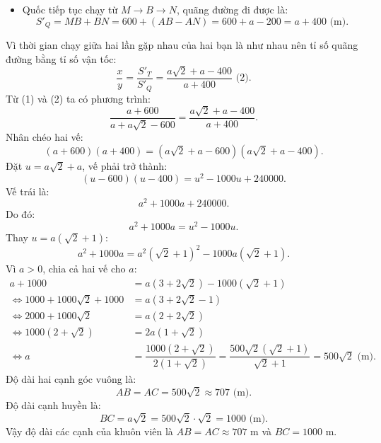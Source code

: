 \begin{bt}
{\begin{enumerate}[a)]
\begin{itemize}
		$$S'_T = MC + CA + AN = (a\sqrt{2} - 600) + a + 200 = a\sqrt{2} + a - 400\text{ (m)}.$$
		\item Quốc tiếp tục chạy từ $M \to B \to N$, quãng đường đi được là:
		$$S'_Q = MB + BN = 600 + (AB - AN) = 600 + a - 200 = a + 400\text{ (m)}.$$
	\end{itemize}
	Vì thời gian chạy giữa hai lần gặp nhau của hai bạn là như nhau nên tỉ số quãng đường bằng tỉ số vận tốc:
	$$\dfrac{x}{y} = \dfrac{S'_T}{S'_Q} = \dfrac{a\sqrt{2} + a - 400}{a + 400}\text{ (2)}.$$
	Từ (1) và (2) ta có phương trình:
	$$\dfrac{a + 600}{a + a\sqrt{2} - 600} = \dfrac{a\sqrt{2} + a - 400}{a + 400}.$$
	Nhân chéo hai vế:
	$$(a + 600)(a + 400) = (a\sqrt{2} + a - 600)(a\sqrt{2} + a - 400).$$
	Đặt $u = a\sqrt{2} + a$, vế phải trở thành:
	$$(u - 600)(u - 400) = u^2 - 1000u + 240000.$$
	Vế trái là:
	$$a^2 + 1000a + 240000.$$
	Do đó:
	$$a^2 + 1000a = u^2 - 1000u.$$
	Thay $u = a(\sqrt{2} + 1)$:
	$$a^2 + 1000a = a^2(\sqrt{2} + 1)^2 - 1000a(\sqrt{2} + 1).$$
	Vì $a > 0$, chia cả hai vế cho $a$:
	\begin{align*}
		a + 1000 &= a(3 + 2\sqrt{2}) - 1000(\sqrt{2} + 1) \\
		\iff 1000 + 1000\sqrt{2} + 1000 &= a(3 + 2\sqrt{2} - 1) \\
		\iff 2000 + 1000\sqrt{2} &= a(2 + 2\sqrt{2}) \\
		\iff 1000(2 + \sqrt{2}) &= 2a(1 + \sqrt{2}) \\
		\iff a &= \dfrac{1000(2 + \sqrt{2})}{2(1 + \sqrt{2})} = \dfrac{500\sqrt{2}(\sqrt{2} + 1)}{\sqrt{2} + 1} = 500\sqrt{2}\text{ (m)}.
	\end{align*}
	Độ dài hai cạnh góc vuông là:
	$$AB = AC = 500\sqrt{2} \approx 707\text{ (m)}.$$
	Độ dài cạnh huyền là:
	$$BC = a\sqrt{2} = 500\sqrt{2} \cdot \sqrt{2} = 1000\text{ (m)}.$$
	Vậy độ dài các cạnh của khuôn viên là $AB = AC \approx 707\text{ m}$ và $BC = 1000\text{ m}$.
\end{enumerate}
}
\end{bt}

